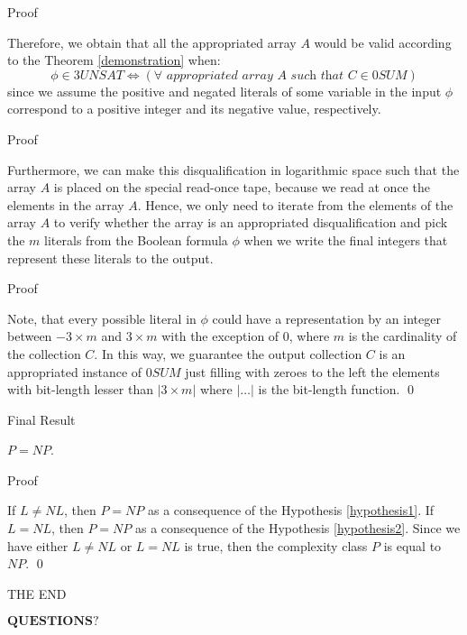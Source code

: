 \documentclass[11pt]{beamer}
\begin{document}
\begin{frame}{Proof}

Therefore, we obtain that all the appropriated array $A$ would be valid according to the Theorem \ref{demonstration} when:
\[\phi \in 3UNSAT \Leftrightarrow (\forall \textit{ appropriated array } A \textit{ such that } C \in 0SUM)\]
since we assume the positive and negated literals of some variable in the input $\phi$ correspond to a positive integer and its negative value, respectively.

\end{frame}

\begin{frame}{Proof}

Furthermore, we can make this disqualification in logarithmic space such that the array $A$ is placed on the special read-once tape, because we read at once the elements in the array $A$. Hence, we only need to iterate from the elements of the array $A$ to verify whether the array is an appropriated disqualification and pick the $m$ literals from the Boolean formula $\phi$ when we write the final integers that represent these literals to the output.

\end{frame}

\begin{frame}{Proof}

Note, that every possible literal in $\phi$ could have a representation by an integer between $-3 \times m$ and $3 \times m$ with the exception of $0$, where $m$ is the cardinality of the collection $C$. In this way, we guarantee the output collection $C$ is an appropriated instance of $0SUM$ just filling with zeroes to the left the elements with bit-length lesser than $|3 \times m|$ where $|\ldots|$ is the bit-length function. \qed

\end{frame}

\begin{frame}{Final Result}

\begin{theorem}
$P = NP$.
\end{theorem}

\end{frame}

\begin{frame}{Proof}

If $L \neq NL$, then $P = NP$ as a consequence of the Hypothesis \ref{hypothesis1}. If $L = NL$, then $P = NP$ as a consequence of the Hypothesis \ref{hypothesis2}. Since we have either $L \neq NL$ or $L = NL$ is true, then the complexity class $P$ is equal to $NP$. \qed

\end{frame}


\begin{frame}{THE END}

\begin{center}
$\textbf{QUESTIONS?}$
\end{center}

\end{frame}
\end{document}
